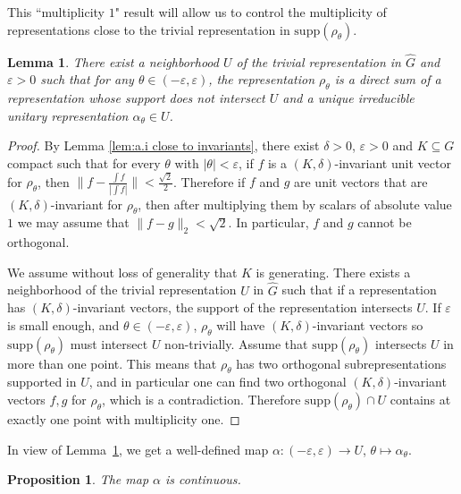 \documentclass[12pt,reqno]{amsart}
\newtheorem{lemma}[theorem]{Lemma}
\newtheorem{proposition}[theorem]{Proposition}
\theoremstyle{definition}
\newcommand{\abs}[1]{\left| #1 \right|}
\begin{document}
This ``multiplicity $1$" result will allow us to control the multiplicity of representations close to the trivial representation in $\mathrm{supp}(\rho_{\theta})$. 
\begin{lemma}\label{lem:multiplicity 1 a.i}
    There exist a neighborhood $U$ of the trivial representation in $\widehat{G}$ and $\varepsilon > 0$ such that for any $\theta \in (-\varepsilon,\varepsilon)$, the representation $\rho_\theta$ is a direct sum of a representation whose support does not intersect $U$ and a unique irreducible unitary representation $\alpha_\theta \in U$.
\end{lemma}
\begin{proof}
    By Lemma \ref{lem:a.i close to invariants}, there exist $\delta>0$, $\varepsilon>0$ and $K \subseteq G$ compact such that for every $\theta$ with $\abs{\theta} < \varepsilon$, if $f$ is a $(K,\delta)$-invariant unit vector for $\rho_\theta$, then $\|f - \frac{\int f}{|\int f|}\| < \frac{\sqrt{2}}{2}$. Therefore if $f$ and $g$ are unit vectors that are $(K,\delta)$-invariant for $\rho_\theta$, then after multiplying them by scalars of absolute value $1$ we may assume that $\|f-g\|_2 < \sqrt{2}$. In particular, $f$ and $g$ cannot be orthogonal.
    
    We assume without loss of generality that $K$ is generating. There exists a neighborhood of the trivial representation $U$ in $\widehat{G}$ such that if a representation has $(K,\delta)$-invariant vectors, the support of the representation intersects $U$. If $\varepsilon$ is small enough, and  $\theta\in (-\varepsilon, \varepsilon)$, $\rho_\theta$ will have $(K,\delta)$-invariant vectors so $\mathrm{supp}(\rho_\theta)$ must intersect $U$ non-trivially. Assume that $\mathrm{supp}(\rho_\theta)$ intersects $U$ in more than one point. This means that $\rho_\theta$ has two orthogonal subrepresentations supported in $U$, and in particular one can find two orthogonal $(K,\delta)$-invariant vectors $f,g$ for $\rho_\theta$, which is a contradiction. Therefore $\mathrm{supp}(\rho_\theta) \cap U$ contains at exactly one point with multiplicity one.
\end{proof}

In view of Lemma~\ref{lem:multiplicity 1 a.i}, we get a well-defined map $\alpha\colon (-\varepsilon,\varepsilon) \to U$,
$\theta\mapsto \alpha_\theta$.

\begin{proposition}
The map $\alpha$ is continuous.
\end{proposition}
\end{document}
